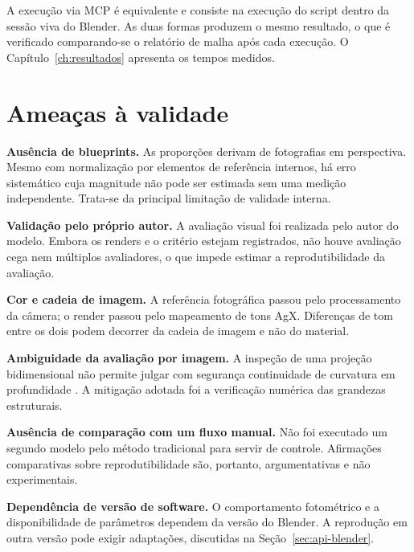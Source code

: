 A execu{\c{c}}\~ao via MCP \'e equivalente e consiste na execu{\c{c}}\~ao do script dentro da
sess\~ao viva do Blender. As duas formas produzem o mesmo resultado, o que \'e verificado
comparando-se o relat\'orio de malha ap\'os cada execu{\c{c}}\~ao. O
Cap\'itulo~\ref{ch:resultados} apresenta os tempos medidos.

\section{Amea{\c{c}}as \`a validade}\label{sec:ameacas}

\textbf{Aus\^encia de blueprints.} As propor{\c{c}}\~oes derivam de fotografias em perspectiva.
Mesmo com normaliza{\c{c}}\~ao por elementos de refer\^encia internos, h\'a erro sistem\'atico
cuja magnitude n\~ao pode ser estimada sem uma medi{\c{c}}\~ao independente. Trata-se da
principal limita{\c{c}}\~ao de validade interna.

\textbf{Valida{\c{c}}\~ao pelo pr\'oprio autor.} A avalia{\c{c}}\~ao visual foi realizada pelo
autor do modelo. Embora os renders e o crit\'erio estejam registrados, n\~ao houve
avalia{\c{c}}\~ao cega nem m\'ultiplos avaliadores, o que impede estimar a
reprodutibilidade da avalia{\c{c}}\~ao.

\textbf{Cor e cadeia de imagem.} A refer\^encia fotogr\'afica passou pelo
processamento da c\^amera; o render passou pelo mapeamento de tons AgX. Diferen{\c{c}}as de tom
entre os dois podem decorrer da cadeia de imagem e n\~ao do material.

\textbf{Ambiguidade da avalia{\c{c}}\~ao por imagem.} A inspe{\c{c}}\~ao de uma proje{\c{c}}\~ao
bidimensional n\~ao permite julgar com seguran{\c{c}}a continuidade de curvatura em
profundidade \cite{hartley2004}. A mitiga{\c{c}}\~ao adotada foi a verifica{\c{c}}\~ao
num\'erica das grandezas estruturais.

\textbf{Aus\^encia de compara{\c{c}}\~ao com um fluxo manual.} N\~ao foi executado um segundo
modelo pelo m\'etodo tradicional para servir de controle. Afirma{\c{c}}\~oes comparativas sobre
reprodutibilidade s\~ao, portanto, argumentativas e n\~ao experimentais.

\textbf{Depend\^encia de vers\~ao de software.} O comportamento fotom\'etrico e a
disponibilidade de par\^ametros dependem da vers\~ao do Blender. A
reprodu{\c{c}}\~ao em outra vers\~ao pode exigir adapta{\c{c}}\~oes, discutidas na
Se{\c{c}}\~ao~\ref{sec:api-blender}.
